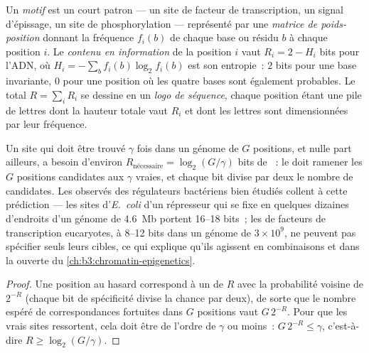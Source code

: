 \begin{definition}\label{def:b3:bioinformatics:motif}
Un \emph{motif} est un court patron --- un site de facteur de
transcription, un signal d'épissage, un site de phosphorylation ---
représenté par une \emph{matrice de poids-position} donnant la
fréquence $f_{i}(b)$ de chaque base ou résidu $b$ à chaque position
$i$. Le \emph{contenu en information} de la position $i$ vaut
$R_{i} = 2 - H_{i}$ bits pour l'ADN, où $H_{i} =
-\sum_{b} f_{i}(b)\log_{2} f_{i}(b)$ est son entropie~: $2$ bits pour
une base invariante, $0$ pour une position où les quatre bases sont
également probables. Le total $R = \sum_{i} R_{i}$ se dessine en un
\emph{logo de séquence}, chaque position étant une pile de lettres dont
la hauteur totale vaut $R_{i}$ et dont les lettres sont dimensionnées
par leur fréquence.
\end{definition}

\begin{proposition}\label{prop:b3:bioinformatics:bits}
Un site qui doit être trouvé $\gamma$ fois dans un génome de $G$
positions, et nulle part ailleurs, a besoin d'environ
$R_{\text{nécessaire}} = \log_{2}(G/\gamma)$ bits de ~: le  doit ramener les $G$ positions candidates aux
$\gamma$ vraies, et chaque bit divise par deux le nombre de candidates.
Les  observés des régulateurs bactériens bien étudiés collent à
cette prédiction --- les sites d'\emph{E.~coli} d'un répresseur qui se
fixe en quelques dizaines d'endroits d'un génome de \qty{4.6}{Mb}
portent \numrange{16}{18} bits~; les  de facteurs de
transcription eucaryotes, à \numrange{8}{12} bits dans un génome de
$3\times 10^{9}$, ne peuvent pas spécifier seuls leurs cibles, ce qui
explique qu'ils agissent en combinaisons et dans la  ouverte
du \cref{ch:b3:chromatin-epigenetics}.
\end{proposition}
\begin{proof}
Une position au hasard correspond à un  de 
$R$ avec la probabilité voisine de $2^{-R}$ (chaque bit de spécificité
divise la chance par deux), de sorte que le nombre espéré de
correspondances fortuites dans $G$ positions vaut $G\,2^{-R}$. Pour que
les vrais sites ressortent, cela doit être de l'ordre de $\gamma$ ou
moins~: $G\,2^{-R} \le \gamma$, c'est-à-dire $R \ge \log_{2}(G/\gamma)$.
\end{proof}

